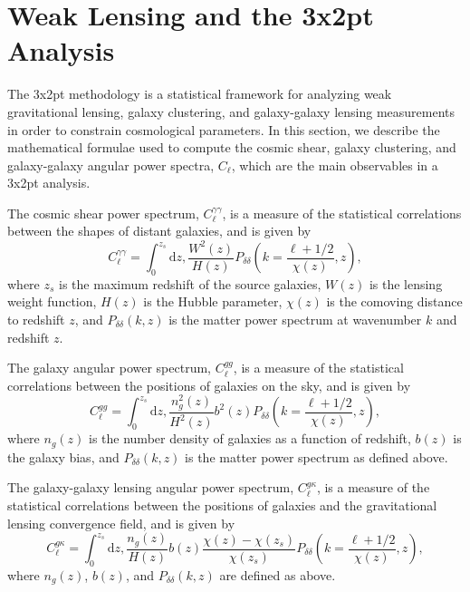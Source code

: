 \documentclass[twocolumn]{aastex631}
\begin{document}
\section{Weak Lensing and the 3x2pt Analysis}

The 3x2pt methodology is a statistical framework for analyzing weak gravitational lensing, galaxy clustering, and galaxy-galaxy lensing measurements in order to constrain cosmological parameters. In this section, we describe the mathematical formulae used to compute the cosmic shear, galaxy clustering, and galaxy-galaxy angular power spectra, $C_\ell$, which are the main observables in a 3x2pt analysis.

The cosmic shear power spectrum, $C_\ell^{\gamma\gamma}$, is a measure of the statistical correlations between the shapes of distant galaxies, and is given by
\begin{equation}
C_\ell^{\gamma\gamma} = \int_0^{z_s} \mathrm{d}z, \frac{W^2(z)}{H(z)} P_{\delta\delta}\left(k = \frac{\ell + 1/2}{\chi(z)}, z\right),
\end{equation}
where $z_s$ is the maximum redshift of the source galaxies, $W(z)$ is the lensing weight function, $H(z)$ is the Hubble parameter, $\chi(z)$ is the comoving distance to redshift $z$, and $P_{\delta\delta}(k, z)$ is the matter power spectrum at wavenumber $k$ and redshift $z$.

The galaxy angular power spectrum, $C_\ell^{gg}$, is a measure of the statistical correlations between the positions of galaxies on the sky, and is given by
\begin{equation}
C_\ell^{gg} = \int_0^{z_s} \mathrm{d}z, \frac{n_g^2(z)}{H^2(z)} b^2(z) P_{\delta\delta}\left(k = \frac{\ell + 1/2}{\chi(z)}, z\right),
\end{equation}
where $n_g(z)$ is the number density of galaxies as a function of redshift, $b(z)$ is the galaxy bias, and $P_{\delta\delta}(k, z)$ is the matter power spectrum as defined above.

The galaxy-galaxy lensing angular power spectrum, $C_\ell^{g\kappa}$, is a measure of the statistical correlations between the positions of galaxies and the gravitational lensing convergence field, and is given by
\begin{equation}
C_\ell^{g\kappa} = \int_0^{z_s} \mathrm{d}z, \frac{n_g(z)}{H(z)} b(z) \frac{\chi(z) - \chi(z_s)}{\chi(z_s)} P_{\delta\delta}\left(k = \frac{\ell + 1/2}{\chi(z)}, z\right),
\end{equation}
where $n_g(z)$, $b(z)$, and $P_{\delta\delta}(k, z)$ are defined as above.
\end{document}
